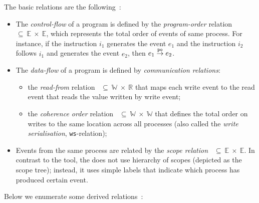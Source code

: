 \vspace{1em}
The basic relations are the following~\cite{alglave2010shared}:
\begin{itemize}
    \item The \textit{control-flow} of a program is defined by the \textit{program-order} relation \po~$\subseteq~\mathbb{E}~\times~\mathbb{E}$, which represents the total order of events of same process.
    For instance, if the instruction $i_1$ generates the event $e_1$ and the instruction $i_2$ follows $i_1$ and generates the event $e_2$, then $e_1 \overset{\mathtt{po}}{\rightarrow} e_2$.

    \item The \textit{data-flow} of a program is defined by \textit{communication relations}:
        \begin{itemize}[noitemsep]
            \item the \textit{read-from} relation \rf~$\subseteq~\mathbb{W}~\times~\mathbb{R}$ that maps each write event to the read event that reads the value written by write event;
            \item the \textit{coherence order} relation \co~$\subseteq~\mathbb{W}~\times~\mathbb{W}$ that defines the total order on writes to the same location across all processes (also called the \textit{write serialisation}, \texttt{ws}-relation);
        \end{itemize}

    \item Events from the same process are related by the \textit{scope relation} \sr~$\subseteq~\mathbb{E}~\times~\mathbb{E}$.
    In contrast to the  tool, the \porthos[2] does not use hierarchy of scopes (depicted as the scope tree); instead, it uses simple labels that indicate which process has produced certain event.
\end{itemize}


Below we enumerate some derived relations~\cite{alglave2010shared}:

